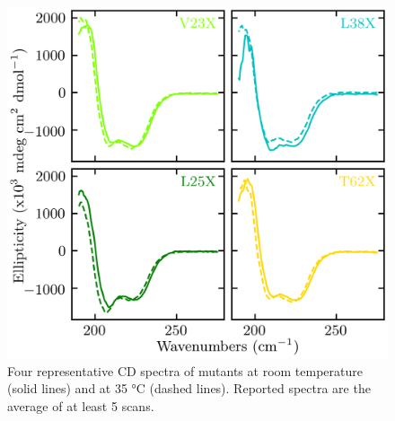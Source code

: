 \begin{figure}
    \center
    \includegraphics[width=\single]{figures-snase/cd_spectra.png}
    \caption[Representative CD spectra of mutants at room temperature and at 35 \si{\celsius}]{
        Four representative CD spectra of mutants at room temperature (solid lines) and at 35 \si{\celsius} (dashed lines). 
        Reported spectra are the average of at least 5 scans.
    }
    \label{fig:snase-cd}
\end{figure}

